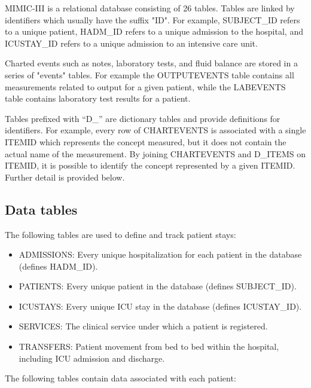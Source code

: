 \documentclass[english]{article}
\begin{document}

MIMIC-III is a relational database consisting of 26 tables. Tables are linked by identifiers which usually have the suffix "ID". For example, SUBJECT\_ID refers to a unique patient, HADM\_ID refers to a unique admission to the hospital, and ICUSTAY\_ID refers to a unique admission to an intensive care unit.

Charted events such as notes, laboratory tests, and fluid balance are stored in a series of "events" tables. For example the OUTPUTEVENTS table contains all measurements related to output for a given patient, while the LABEVENTS table contains laboratory test results for a patient.

Tables prefixed with “D\_” are dictionary tables and provide definitions for identifiers. For example, every row of CHARTEVENTS is associated with a single ITEMID which represents the concept measured, but it does not contain the actual name of the measurement. By joining CHARTEVENTS and D\_ITEMS on ITEMID, it is possible to identify the concept represented by a given ITEMID. Further detail is provided below.

\subsection*{Data tables}

The following tables are used to define and track patient stays:

\begin{itemize}
  \item ADMISSIONS: Every unique hospitalization for each patient in the database (defines HADM\_ID).
  \item PATIENTS: Every unique patient in the database (defines SUBJECT\_ID).
  \item ICUSTAYS: Every unique ICU stay in the database (defines ICUSTAY\_ID).
  \item SERVICES: The clinical service under which a patient is registered.
  \item TRANSFERS: Patient movement from bed to bed within the hospital, including ICU admission and discharge.
\end{itemize}

The following tables contain data associated with each patient:
\end{document}
